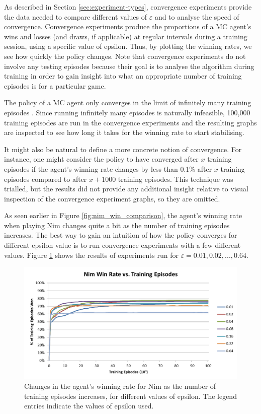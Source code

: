 \documentclass[11pt,a4paper]{report}
\begin{document}
As described in Section \ref{sec:experiment-types}, convergence experiments provide the data needed to compare different values of $\varepsilon$ and to analyse the speed of convergence. Convergence experiments produce the proportions of a MC agent's wins and losses (and draws, if applicable) at regular intervals during a training session, using a specific value of epsilon. Thus, by plotting the winning rates, we see how quickly the policy changes. Note that convergence experiments do not involve any testing episodes because their goal is to analyse the algorithm during training in order to gain insight into what an appropriate number of training episodes is for a particular game.

The policy of a MC agent only converges in the limit of infinitely many training episodes \cite{rl-book}. Since running infinitely many episodes is naturally infeasible, 100,000 training episodes are run in the convergence experiments and the resulting graphs are inspected to see how long it takes for the winning rate to start stabilising.

It might also be natural to define a more concrete notion of convergence. For instance, one might consider the policy to have converged after $x$ training episodes if the agent's winning rate changes by less than 0.1\% after $x$ training episodes compared to after $x+1000$ training episodes. This technique was trialled, but the results did not provide any additional insight relative to visual inspection of the convergence experiment graphs, so they are omitted.

As seen earlier in Figure \ref{fig:nim_win_comparison}, the agent's winning rate when playing Nim changes quite a bit as the number of training episodes increases. The best way to gain an intuition of how the policy converges for different epsilon value is to run convergence experiments with a few different values. Figure \ref{nim-convergence-comparison} shows the results of experiments run for $\varepsilon = 0.01, 0.02,..., 0.64$.

\begin{figure}[htbp]
	\begin{center}
		\includegraphics[width=\linewidth]{Nim_PerformanceResults_Comparison_001_to_064.png}
		\caption{Changes in the agent's winning rate for Nim as the number of training episodes increases, for different values of epsilon. The legend entries indicate the values of epsilon used.}
		\label{nim-convergence-comparison}
	\end{center}
\end{figure}
\end{document}
